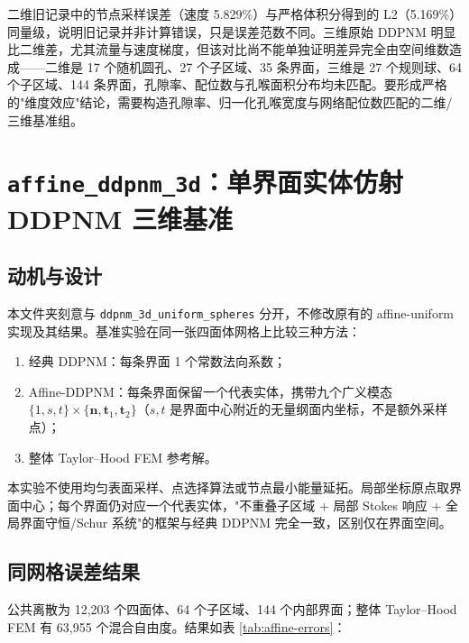 \documentclass[11pt,a4paper]{ctexart}
\newcommand{\Dd}{DDPNM}
\begin{document}
二维旧记录中的节点采样误差（速度 5.829\%）与严格体积分得到的 L2（5.169\%）同量级，说明旧记录并非计算错误，只是误差范数不同。三维原始 \Dd{} 明显比二维差，尤其流量与速度梯度，但该对比尚不能单独证明差异完全由空间维数造成——二维是 17 个随机圆孔、27 个子区域、35 条界面，三维是 27 个规则球、64 个子区域、144 条界面，孔隙率、配位数与孔喉面积分布均未匹配。要形成严格的"维度效应"结论，需要构造孔隙率、归一化孔喉宽度与网络配位数匹配的二维/三维基准组。

\newpage
\section{\texttt{affine\_ddpnm\_3d}：单界面实体仿射 \Dd{} 三维基准}
\label{sec:affine}

\subsection{动机与设计}
\label{sec:affine-design}

本文件夹刻意与 \texttt{ddpnm\_3d\_uniform\_spheres} 分开，不修改原有的 affine-uniform 实现及其结果。基准实验在同一张四面体网格上比较三种方法：

\begin{enumerate}[itemsep=2pt]
  \item 经典 \Dd{}：每条界面 1 个常数法向系数；
  \item Affine-\Dd{}：每条界面保留一个代表实体，携带九个广义模态 $\{1,s,t\}\times\{\boldsymbol{n},\boldsymbol{t}_1,\boldsymbol{t}_2\}$（$s,t$ 是界面中心附近的无量纲面内坐标，不是额外采样点）；
  \item 整体 Taylor--Hood FEM 参考解。
\end{enumerate}

本实验不使用均匀表面采样、点选择算法或节点最小能量延拓。局部坐标原点取界面中心；每个界面仍对应一个代表实体，"不重叠子区域 + 局部 Stokes 响应 + 全局界面守恒/Schur 系统"的框架与经典 \Dd{} 完全一致，区别仅在界面空间。

\subsection{同网格误差结果}
\label{sec:affine-errors}

公共离散为 12{,}203 个四面体、64 个子区域、144 个内部界面；整体 Taylor--Hood FEM 有 63{,}955 个混合自由度。结果如表 \ref{tab:affine-errors}：
\end{document}
